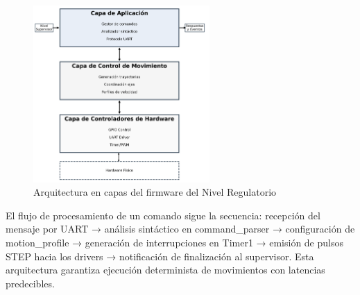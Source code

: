 \begin{figure}[H]
    \centering
    \includegraphics[width=0.6\textwidth]{imagenes/arquitectura_regulatorio_capas.png}
    \caption{Arquitectura en capas del firmware del Nivel Regulatorio}
    \label{fig:arquitectura_regulatorio}
\end{figure}

El flujo de procesamiento de un comando sigue la secuencia: recepción del mensaje por UART → análisis sintáctico en command\_parser → configuración de motion\_profile → generación de interrupciones en Timer1 → emisión de pulsos STEP hacia los drivers → notificación de finalización al supervisor. Esta arquitectura garantiza ejecución determinista de movimientos con latencias predecibles.
